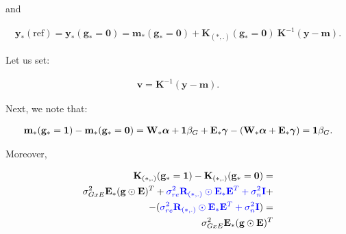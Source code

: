 

and

\begin{align}
    \mathbf{y}_*(\mathrm{ref}) = \mathbf{y}_*(\mathbf{g}_*=\mathbf{0}) = \mathbf{m}_*(\mathbf{g}_*=\mathbf{0}) + \mathbf{K}_{(*,.)}(\mathbf{g}_*=\mathbf{0}) \ \mathbf{K}^{-1} (\mathbf{y}-\mathbf{m}).
\end{align}




Let us set:

\begin{align}
    \mathbf{v} = \mathbf{K}^{-1}(\mathbf{y}-\mathbf{m}).
\end{align}

Next, we note that:

\begin{align}
    \mathbf{m}_*(\mathbf{g}_*=\mathbf{1}) - \mathbf{m}_*(\mathbf{g}_*=\mathbf{0}) = \mathbf{W}_*\boldsymbol{\alpha} + \mathbf{1}\beta_G + \mathbf{E}_* \boldsymbol{\gamma} - (\mathbf{W}_*\boldsymbol{\alpha} + \mathbf{E}_* \boldsymbol{\gamma}) = \mathbf{1}\beta_G.
\end{align}

Moreover, 

\begin{align}
\begin{split}
    \mathbf{K}_{(*,.)}(\mathbf{g}_*=\mathbf{1}) - \mathbf{K}_{(*,.)}(\mathbf{g}_*=\mathbf{0}) =\\ \sigma_{GxE}^2\mathbf{E}_*(\mathbf{g}\odot\mathbf{E})^T +
        \textcolor{blue}{\sigma_{re}^2 \mathbf{R}_{(*,.)} \odot \mathbf{E}_*\mathbf{E}^T  + \sigma^2_n \mathbf{I}} + \\- (\textcolor{blue}{\sigma_{re}^2 \mathbf{R}_{(*,.)} \odot \mathbf{E}_*\mathbf{E}^T  + \sigma^2_n \mathbf{I}}) = \\ \sigma_{GxE}^2\mathbf{E}_*(\mathbf{g}\odot\mathbf{E})^T
\end{split}
\end{align}

